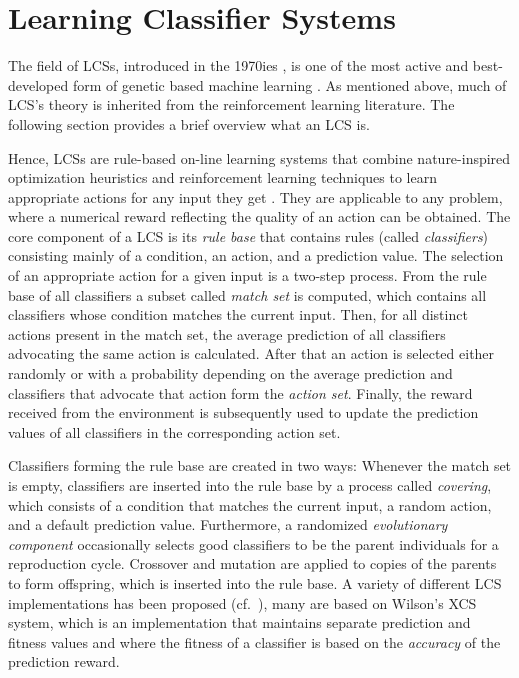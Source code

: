 \documentclass{sig-alternate}
\begin{document}
%

\section{Learning Classifier Systems}
\label{section:learning-classifier-systems}

The field of LCSs, introduced in the 1970ies \cite{Hol75,Hol76,HR78}, is one of the most active and best-developed form of genetic based machine learning \cite{Kov02a,KL00,Lan08}. As mentioned above, much of LCS's theory is inherited from the reinforcement learning literature. The following section provides a brief overview what an LCS is. 

Hence, LCSs are rule-based on-line learning systems that combine nature-inspired optimization heuristics and reinforcement learning techniques to learn appropriate actions for any input they get \cite{Wil95}. They are applicable to any problem, where a numerical reward reflecting the quality of an action can be obtained. The core component of a LCS is its \emph{rule base} that contains rules (called \emph{classifiers}) consisting mainly of a condition, an action, and a prediction value. The selection of an appropriate action for a given input is a two-step process. From the rule base of all classifiers a subset called \emph{match set} is computed, which contains all classifiers whose condition matches the current input. Then, for all distinct actions present in the match set, the average prediction of all classifiers advocating the same action is calculated. After that an action is selected either randomly or with a probability depending on the average prediction and classifiers that advocate that action form the \emph{action set}. Finally, the reward received from the environment is subsequently used to update the prediction values of all classifiers in the corresponding action set.

Classifiers forming the rule base are created in two ways: Whenever the match set is empty, classifiers are inserted into the rule base by a process called \emph{covering}, which consists of a condition that matches the current input, a random action, and a default prediction value. Furthermore, a randomized \emph{evolutionary component} occasionally selects %
good classifiers to be the parent individuals for a reproduction cycle. Crossover and mutation are applied to copies of the parents to form offspring, which is inserted into the rule base. A variety of different LCS implementations has been proposed (cf.~\cite{Kov02a}), many are based on Wilson's XCS \cite{Wil95} system, which is an implementation that maintains separate prediction and fitness values and where the fitness of a classifier is based on the \emph{accuracy} of the prediction reward.  %
\end{document}
